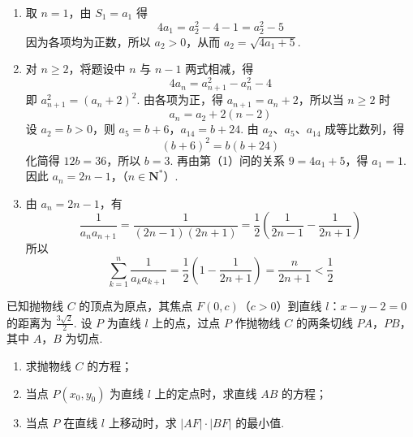 \begin{solution}
\begin{enumerate}
\item
取 \(n=1\)，由 \(S_1=a_1\) 得
\[
4a_1=a_2^2-4-1=a_2^2-5
\]
因为各项均为正数，所以 \(a_2>0\)，从而 \(a_2=\sqrt{4a_1+5}\).

\item
对 \(n\geq2\)，将题设中 \(n\) 与 \(n-1\) 两式相减，得
\[
4a_n=a_{n+1}^2-a_n^2-4
\]
即 \(a_{n+1}^2=(a_n+2)^2\). 由各项为正，得 \(a_{n+1}=a_n+2\)，所以当 \(n\geq2\) 时
\[
a_n=a_2+2(n-2)
\]
设 \(a_2=b>0\)，则 \(a_5=b+6\)，\(a_{14}=b+24\). 由 \(a_2\)、\(a_5\)、\(a_{14}\) 成等比数列，得
\[
(b+6)^2=b(b+24)
\]
化简得 \(12b=36\)，所以 \(b=3\). 再由第（1）问的关系 \(9=4a_1+5\)，得 \(a_1=1\). 因此
\(a_n=2n-1\)，（\(n\in\mathbf N^*\)）.

\item
由 \(a_n=2n-1\)，有
\[
\frac1{a_na_{n+1}}=\frac1{(2n-1)(2n+1)}
=\frac12\left(\frac1{2n-1}-\frac1{2n+1}\right)
\]
所以
\[
\sum_{k=1}^{n}\frac1{a_ka_{k+1}}
=\frac12\left(1-\frac1{2n+1}\right)
=\frac{n}{2n+1}<\frac12
\]
\end{enumerate}
\end{solution}

\begin{problem}
已知抛物线 \(C\) 的顶点为原点，其焦点 \(F(0, c)\)（\(c > 0\)）到直线 \(l\)：\(x - y - 2 = 0\) 的距离为 \(\frac{3\sqrt{2}}{2}\). 设 \(P\) 为直线 \(l\) 上的点，过点 \(P\) 作抛物线 \(C\) 的两条切线 \(PA\)，\(PB\)，其中 \(A\)，\(B\) 为切点.
\begin{enumerate}
\item 求抛物线 \(C\) 的方程；
\item 当点 \(P(x_0, y_0)\) 为直线 \(l\) 上的定点时，求直线 \(AB\) 的方程；
\item 当点 \(P\) 在直线 \(l\) 上移动时，求 \(|AF| \cdot |BF|\) 的最小值.
\end{enumerate}
\end{problem}

